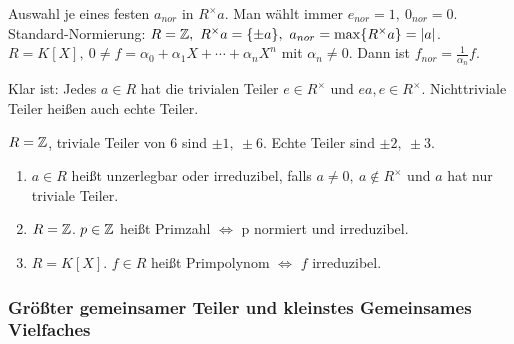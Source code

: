 \documentclass[a4paper,twoside,DIV15,BCOR12mm]{scrbook}
\begin{document}
\begin{definition}[Normierung]Auswahl je eines festen $a_{nor}$ in
$R^{\times}a$. Man wählt immer $e_{nor}=1,\ 0_{nor}=0$.\\
Standard-Normierung: $R=\MdZ,\ R^{\times}a=\{\pm a\},\
a_{nor}=\max\{R^{\times}a\}=|a|$.\\
$R=K[X],\ 0\neq f=\alpha_0+\alpha_1 X + \dotsb + \alpha_n X^n$ mit
$\alpha_n \neq 0$. Dann ist $f_{nor}=\frac{1}{\alpha_n}f$.
\end{definition}
Klar ist: Jedes $a\in R$ hat die trivialen Teiler $e\in R^{\times}$
und $ea,  e \in R^{\times}$. Nichttriviale Teiler heißen auch echte
Teiler.
\begin{beispiel}
 $R=\mathbb{Z}$, triviale Teiler von $6$ sind $\pm 1,\ \pm 6$. Echte
 Teiler sind $\pm 2,\ \pm 3$.
\end{beispiel}
\begin{definition}
    \begin{enumerate}
        \item $a\in R$ heißt unzerlegbar oder irreduzibel, falls
            $a\neq 0,\ a \notin R^{\times}$ und $a$ hat nur triviale Teiler.
        \item $R=\mathbb{Z}$. $p\in\mathbb{Z}$ heißt Primzahl $\iff$ p normiert
            und irreduzibel.
        \item $R=K[X]$. $f \in R$ heißt Primpolynom $\iff$ $f$
            irreduzibel.
    \end{enumerate}
\end{definition}

\subsubsection*{Größter gemeinsamer Teiler und kleinstes Gemeinsames
Vielfaches}
\end{document}

